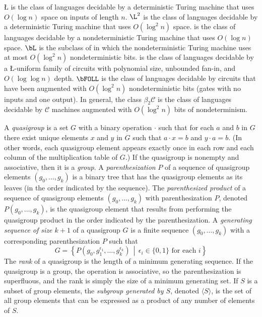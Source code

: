 \documentclass{article}
\begin{document}
\L{} is the class of languages decidable by a deterministic Turing machine that uses $O(\log n)$ space on inputs of length $n$.
$\L^2$ is the class of languages decidable by a deterministic Turing machine that uses $O(\log^2 n)$ space.
\NL{} is the class of languages decidable by a nondeterministic Turing machine that uses $O(\log n)$ space.
$\bL$ is the subclass of \NL{} in which the nondeterministic Turing machine uses at most $O(\log^2 n)$ nondeterministic bits.
\FOLL{} is the class of languages decidable by a \L-uniform family of circuits with polynomial size, unbounded fan-in, and $O(\log \log n)$ depth.
$\bFOLL$ is the class of languages decidable by \FOLL{} circuits that have been augmented with $O(\log^2 n)$ nondeterministic bits (gates with no inputs and one output).
In general, the class $\beta_2 \mathcal{C}$ is the class of languages decidable by $\mathcal{C}$ machines augmented with $O(\log^2 n)$ bits of nondeterminism.

A \emph{quasigroup} is a set $G$ with a binary operation $\cdot$ such that for each $a$ and $b$ in $G$ there exist unique elements $x$ and $y$ in $G$ such that $a \cdot x = b$ and $y \cdot a = b$.
(In other words, each quasigroup element appears exactly once in each row and each column of the multiplication table of $G$.)
If the quasigroup is nonempty and associative, then it is a \emph{group}.
A \emph{parenthesization} $P$ of a sequence of quasigroup elements $(g_0, \dotsc, g_k)$ is a binary tree that has the quasigroup elements as its leaves (in the order indicated by the sequence).
The \emph{parenthesized product} of a sequence of quasigroup elements $(g_0, \dotsc, g_k)$ with parenthesization $P$, denoted $P(g_0, \dotsc, g_k)$, is the quasigroup element that results from performing the quasigroup product in the order indicated by the parenthesization.
A \emph{generating sequence of size $k + 1$} of a quasigroup $G$ is a finite sequence $(g_0, \dotsc, g_k)$ with a corresponding parenthesization $P$ such that
$$
G = \left\{P(g_0, g_1^{\epsilon_1}, \dotsc, g_k^{\epsilon_k}) \, \middle| \, \epsilon_i \in \{0, 1\} \text{ for each } i \right\}
$$
The \emph{rank} of a quasigroup is the length of a minimum generating sequence.
If the quasigroup is a group, the operation is associative, so the parenthesization is superfluous, and the rank is simply the size of a minimum generating set.
If $S$ is a subset of group elements, the \emph{subgroup generated by $S$}, denoted $\langle S \rangle$, is the set of all group elements that can be expressed as a product of any number of elements of $S$.
\end{document}
